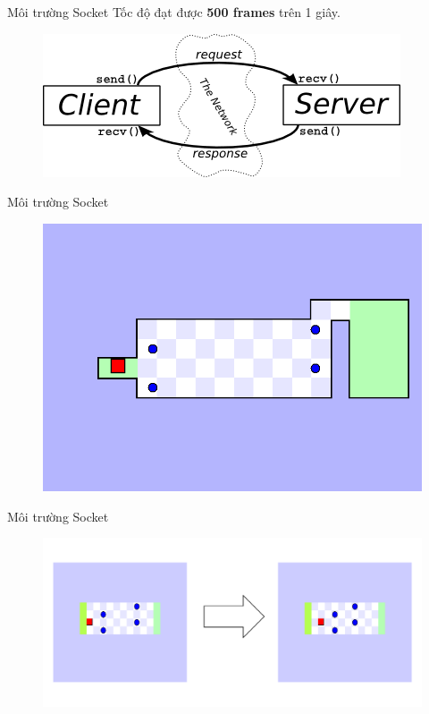 \documentclass{beamer}
\begin{document}
\begin{frame}{Môi trường Socket}
	Tốc độ đạt được \textbf{500 frames} trên 1 giây.
	\begin{figure}
		\centering
		\includegraphics[scale=.5]{Pic/slide/socket-client}
		\captionsetup{labelformat=empty}
	\end{figure}
\end{frame}
\begin{frame}{Môi trường Socket}
	\begin{figure}
		\centering
		\includegraphics[scale=.3]{Pic/slide/env_NoGO}
		\captionsetup{labelformat=empty}
	\end{figure}
\end{frame}
\begin{frame}{Môi trường Socket}
	\begin{figure}
		\centering
		\includegraphics[scale=.5]{Pic/1_step_new_env}
		\captionsetup{labelformat=empty}
	\end{figure}
\end{frame}
\end{document}
